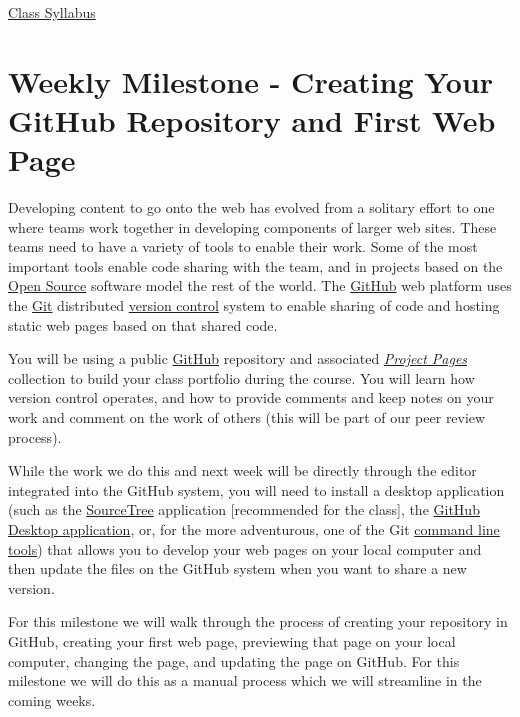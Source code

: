 \documentclass[]{book}
\begin{document}
\href{https://github.com/UNM-GEOG-485-585/class-materials/raw/master/syllabus.pdf}{Class
Syllabus}

\section{Weekly Milestone - Creating Your GitHub Repository and First
Web Page}\label{week01-milestone}

Developing content to go onto the web has evolved from a solitary effort
to one where teams work together in developing components of larger web
sites. These teams need to have a variety of tools to enable their work.
Some of the most important tools enable code sharing with the team, and
in projects based on the \href{http://opensource.org/osd-annotated}{Open
Source} software model the rest of the world. The
\href{https://github.com/}{GitHub} web platform uses the
\href{http://git-scm.com/}{Git} distributed
\href{http://en.wikipedia.org/wiki/Revision_control}{version control}
system to enable sharing of code and hosting static web pages based on
that shared code.

You will be using a public \href{http://github.com}{GitHub} repository
and associated
\href{https://help.github.com/articles/user-organization-and-project-pages/}{\emph{Project
Pages}} collection to build your class portfolio during the course. You
will learn how version control operates, and how to provide comments and
keep notes on your work and comment on the work of others (this will be
part of our peer review process).

While the work we do this and next week will be directly through the
editor integrated into the GitHub system, you will need to install a
desktop application (such as the
\href{https://www.sourcetreeapp.com/}{SourceTree} application
{[}recommended for the class{]}, the
\href{https://desktop.github.com}{GitHub Desktop application}, or, for
the more adventurous, one of the Git
\href{https://git-scm.com/downloads}{command line tools}) that allows
you to develop your web pages on your local computer and then update the
files on the GitHub system when you want to share a new version.

For this milestone we will walk through the process of creating your
repository in GitHub, creating your first web page, previewing that page
on your local computer, changing the page, and updating the page on
GitHub. For this milestone we will do this as a manual process which we
will streamline in the coming weeks.
\end{document}
